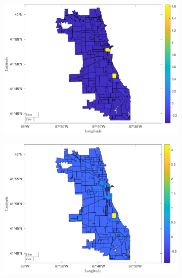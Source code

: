 \documentclass[12pt]{article}
\begin{document}
\begin{figure}[h!]
\centering
    \caption{Home Prices and Residents}
    \begin{subfigure}{0.75\textwidth}
         \centering
         \includegraphics[width=\textwidth]{Pset1/Figures/Single Agent/Counterfactual/Fix Population/housing.pdf}
    \end{subfigure}  
    \begin{subfigure}{0.75\textwidth}
         \centering
         \includegraphics[width=\linewidth]{Pset1/Figures/Single Agent/Counterfactual/Fix Population/residents.pdf}
    \end{subfigure}
    \label{fig:pop_house_res}
\end{figure}
\end{document}
